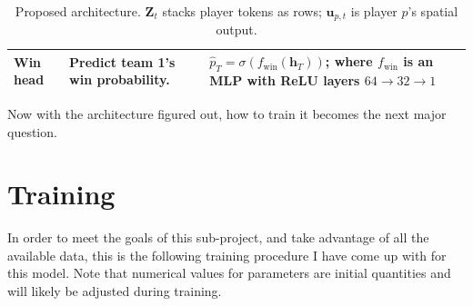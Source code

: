 \documentclass[11pt]{article}
\begin{document}
\begin{table}[H]
\begin{tabularx}{\textwidth}{
        >{\raggedright\arraybackslash}p{}
        >{\raggedright\arraybackslash}X
        >{\raggedright\arraybackslash}p{}
    }
    Win head &
    Predict team 1's win probability. &
    $\hat{p}_T=\sigma(f_{\mathrm{win}}(\mathbf{h}_T))$; where $f_{\mathrm{win}}$ is an MLP with ReLU layers $64\rightarrow32\rightarrow1$\\

    \bottomrule
    \end{tabularx}

    \caption{
        Proposed architecture.
        $\mathbf{Z}_t$ stacks player tokens as rows;
        $\mathbf{u}_{p,t}$ is player $p$'s spatial output.
    }
    \label{tab:model-components}
    \end{table}
    Now with the architecture figured out, how to train it becomes the next major question.


\newpage
\section{Training}
    In order to meet the goals of this sub-project, and take advantage of all the available data, this is the following training procedure I have come up with for this model. Note that numerical values for parameters are initial quantities and will likely be adjusted during training.
\end{document}
